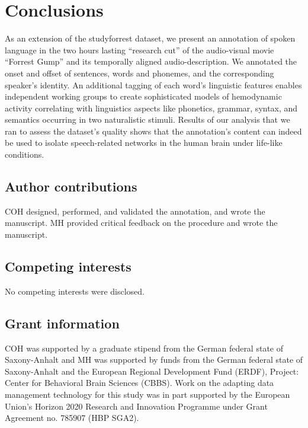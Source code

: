 \documentclass[10pt,a4paper,onecolumn]{article}
\begin{document}
\section*{Conclusions}
As an extension of the studyforrest dataset, we present an annotation of spoken
language in the two hours lasting ``research cut'' of the audio-visual movie
``Forrest Gump'' and its temporally aligned audio-description.
We annotated the onset and offset of sentences, words and phonemes, and the
corresponding speaker's identity.
An additional tagging of each word's linguistic features enables independent
working groups to create sophisticated models of hemodynamic activity
correlating with linguistics aspects like phonetics, grammar, syntax, and
semantics occurring in two naturalistic stimuli.
Results of our analysis that we ran to assess the dataset's quality shows that
the annotation's content can indeed be used to isolate speech-related networks
in the human brain under life-like conditions.


\subsection*{Author contributions}
COH designed, performed, and validated the annotation, and wrote the manuscript.
MH provided critical feedback on the procedure and wrote the manuscript.

\subsection*{Competing interests}
No competing interests were disclosed.

\subsection*{Grant information}
COH was supported by a graduate stipend from the German federal state of
Saxony-Anhalt and MH was supported by funds from the German federal state of
Saxony-Anhalt and the European Regional Development Fund (ERDF), Project:
Center for Behavioral Brain Sciences (CBBS). Work on the adapting data
management technology for this study was in part supported by the European
Union's Horizon 2020 Research and Innovation Programme under Grant Agreement
no. 785907 (HBP SGA2).
\end{document}
